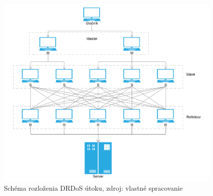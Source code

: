 \documentclass[
  digital, %
  table,   %
  lof,     %
  nolot,   %
  nocover
]{fithesis3}
\begin{document}
\begin{figure}[h]
  \centering
    \includegraphics[width=\textwidth]{images/drdos.png}
  \caption{Schéma rozloženia DRDoS útoku, zdroj: vlastné spracovanie}
  \label{fig:drdos}
\end{figure}


\end{document}
